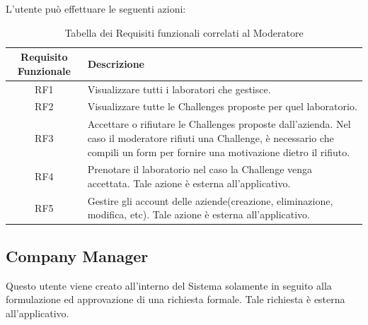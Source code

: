 L'utente può effettuare le seguenti azioni:

\begin{table}[ht]
    \centering
    \begin{tabularx}{\textwidth}{|c|X|}
        \hline
        \textbf{Requisito Funzionale} & \textbf{Descrizione}\\
        \hline
        RF1 & Visualizzare tutti i laboratori che gestisce.\\ 
        \hline
        RF2 & Visualizzare tutte le Challenges proposte per quel laboratorio.\\ 
        \hline
        RF3 & Accettare o rifiutare le Challenges proposte dall'azienda. Nel caso il moderatore rifiuti una Challenge, è necessario che compili un form per fornire una motivazione dietro il rifiuto.\\ 
        \hline
        RF4 & Prenotare il laboratorio nel caso la Challenge venga accettata. Tale azione è esterna all'applicativo.\\ 
        \hline
        RF5 & Gestire gli account delle aziende(creazione, eliminazione, modifica, etc). Tale azione è esterna all'applicativo.\\ 
        \hline
    \end{tabularx}
    \caption{Tabella dei Requisiti funzionali correlati al Moderatore}
\end{table}


\subsection{Company Manager}

Questo utente viene creato all'interno del Sistema solamente in seguito alla formulazione ed approvazione di una richiesta formale. Tale richiesta è esterna all'applicativo.

